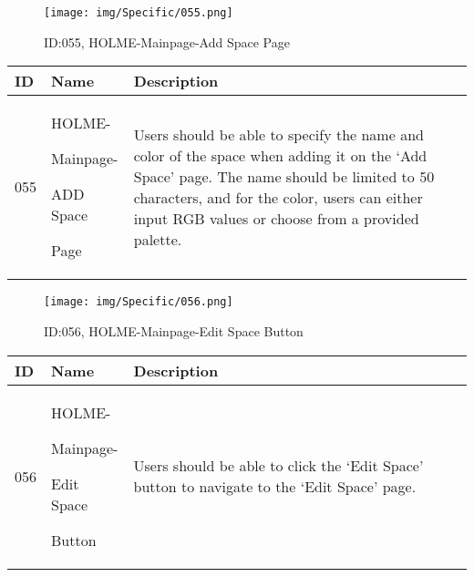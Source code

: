 \documentclass[conference]{IEEEtran}
\begin{document}
\begin{enumerate}
\begin{figure}[h]
\centering
\texttt{[image: img/Specific/055.png]}
\caption{ID:055, HOLME-Mainpage-Add Space Page}
\end{figure}
\begin{table}[h]
\def\arraystretch{1.2} \small
    \begin{tabular}{|p{1cm}|p{1.8cm}|p{5.0cm}|}
        \hline
        ID & Name & Description\\ \hline
         055 \par  & HOLME-\par Mainpage-\par ADD Space\par Page  &Users should be able to specify the name and color of the space when adding it on the `Add Space' page. The name should be limited to 50 characters, and for the color, users can either input RGB values or choose from a provided palette.\\ \hline
    \end{tabular}
\end{table}

\begin{figure}[h]
\centering
\texttt{[image: img/Specific/056.png]}
\caption{ID:056, HOLME-Mainpage-Edit Space Button}
\end{figure}
\begin{table}[h]
\def\arraystretch{1.2} \small
    \begin{tabular}{|p{1cm}|p{1.8cm}|p{5.0cm}|}
        \hline
        ID & Name & Description\\ \hline
         056 \par  & HOLME-\par Mainpage-\par Edit Space\par Button &Users should be able to click the `Edit Space' button to navigate to the `Edit Space' page.\\ \hline
    \end{tabular}
\end{table}


\end{enumerate}
\end{document}
